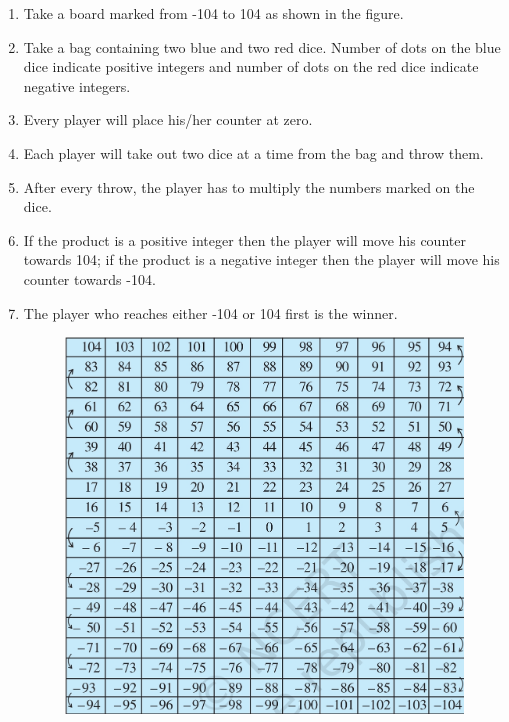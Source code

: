 \begin{enumerate}[label=\thesection.\arabic*, ref=\thesection.\theenumi]
	\item Take a board marked from -104 to 104 as shown in the figure.	
	\item Take a bag containing two blue and two red dice.  Number of dots on the blue dice indicate positive integers and number of dots on the red dice indicate negative integers.
	\item Every player will place his/her counter at zero.
	\item Each player will take out two dice at a time from the bag and throw them.
	\item After every throw, the player has to multiply the numbers marked on the dice.
	\item If the product is a positive integer then the player will move his counter towards 104; if the product is a negative integer then the player will move his counter towards -104.
	\item The player who reaches either -104 or 104 first is the winner.
		\begin{figure}[H]
  \centering
  \includegraphics[width=\columnwidth]{figs/game1.jpg}
  \caption{}
  \label{fig:game1}
\end{figure}
\end{enumerate}
%

